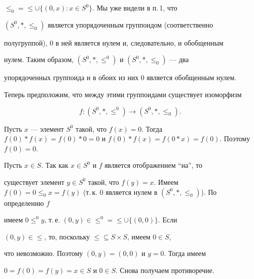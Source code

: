 $\le_0=\le\cup\{(0,x):x\in S^0\}$. Мы уже видели в п.\,1, что 


$(S^0,*,\le_0)$ является упорядоченным группоидом (соответственно 


полугруппой), 0 в ней является нулем и, следовательно, и обобщенным 


нулем. Таким образом, $(S^0,*,\le^0)$ и $(S^0,*,\le_0)$ --- два 


упорядоченных группоида и в обоих из них 0 является обобщенным нулем. 


Теперь предположим, что между этими группоидами существует изоморфизм 


$$ 


f:(S^0,*,\le^0)\to(S^0,*,\le_0). 


$$ 


Пусть $x$ --- элемент $S^0$ такой, что $f(x)=0$. Тогда $f(0)* 


f(x)=f(0)*0=0$ и $f(0)* f(x)=f(0*x)=f(0)$. Поэтому $f(0)=0$. 


 


Пусть $x\in S$. Так как $x\in S^0$ и $f$ является отображением ``на'', то 


существует элемент $y\in S^0$ такой, что $f(y)=x$. Имеем $f(0)=0\le_0 


x=f(y)$ (т.\,к. 0 является нулем в $(S^0,*,\le_0)$). По определению $f$ 


имеем $0\le^0y$, т.\,е. $(0,y)\in\le^0=\le \cup\{(0,0)\}$. Если 


$(0,y)\in\le$, то, поскольку $\le\subseteq S\times S$, имеем $0\in S$, 


что невозможно. Поэтому $(0,y)=(0,0)$ и $y=0$. Тогда имеем 


$0=f(0)=f(y)=x\in S$ и $0\in S$. Снова получаем противоречие. 


 


